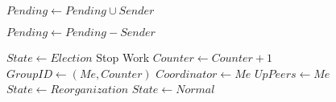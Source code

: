 \begin{flushleft}
\begin{algorithmic}[H]
        \State $Pending \gets Pending \cup {Sender}$
    \EndIf
\EndFunction

    \State $Pending \gets Pending - {Sender}$
\EndFunction

\State

    \State $State \gets Election$
    \State Stop Work
    \State $Counter \gets Counter + 1$
    \State $GroupID \gets (Me,Counter)$
    \State $Coordinator \gets Me$
    \State $UpPeers \gets {Me}$
    \State $State \gets Reorganization$
    \State $State \gets Normal$
\EndFunction

\end{algorithmic}
\end{flushleft}
